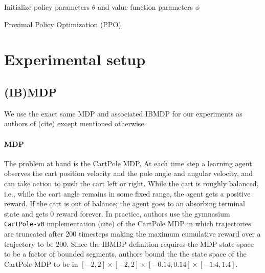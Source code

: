 \begin{algorithm}
    Initialize policy parameters $\theta$ and value function parameters $\phi$ \\
    \caption{Proximal Policy Optimization (PPO)}\label{alg:ppo}
\end{algorithm}

\section{Experimental setup}
\subsection{(IB)MDP} 

We use the exact same MDP and associated IBMDP for our experiments as authors of (cite) except mentioned otherwise.

\paragraph{MDP} The problem at hand is the CartPole MDP. At each time step a learning agent observes the cart position velocity and the pole angle and angular velocity, and can take action to push the cart left or right. While the cart is roughly balanced, i.e., while the cart angle remains in some fixed range, the agent gets a positive reward.
If the cart is out of balance; the agent goes to an absorbing terminal state and gets 0 reward forever.
In practice, authors use the gymnasium \texttt{CartPole-v0} implementation (cite) of the CartPole MDP in which trajectories are truncated after 200 timesteps making the maximum cumulative reward over a trajectory to be 200.
Since the IBMDP definition requires the MDP state space to be a factor of bounded segments, authors bound the the state space of the CartPole MDP to be in $[-2, 2] \times [-2, 2] \times [-0.14, 0.14] \times [-1.4, 1.4]$.

